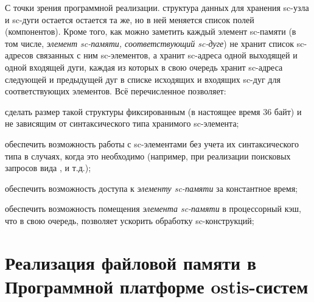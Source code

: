 С точки зрения программной реализации. структура данных для хранения sc-узла и sc-дуги остается остается та же, но в ней меняется список полей (компонентов). Кроме того, как можно заметить каждый элемент sc-памяти (в том числе, \textit{элемент sc-памяти, соответствующий sc-дуге}) не хранит список sc-адресов связанных с ним sc-элементов, а хранит sc-адреса одной выходящей и одной входящей дуги, каждая из которых в свою очередь хранит sc-адреса следующей и предыдущей дуг в списке исходящих и входящих sc-дуг для соответствующих элементов. Всё перечисленное позволяет:

\begin{textitemize}
    \item сделать размер такой структуры фиксированным (в настоящее время 36 байт) и не зависящим от синтаксического типа хранимого sc-элемента;
    \item обеспечить возможность работы с sc-элементами без учета их синтаксического типа в случаях, когда это необходимо (например, при реализации поисковых запросов вида ,  и т.д.);
    \item обеспечить возможность доступа к \textit{элементу sc-памяти} за константное время;
    \item обеспечить возможность помещения \textit{элемента sc-памяти} в процессорный кэш, что в свою очередь, позволяет ускорить обработку sc-конструкций;
\end{textitemize}

\section{Реализация файловой памяти в Программной платформе ostis-систем}
\label{sec_soft_platform_file_storage}

